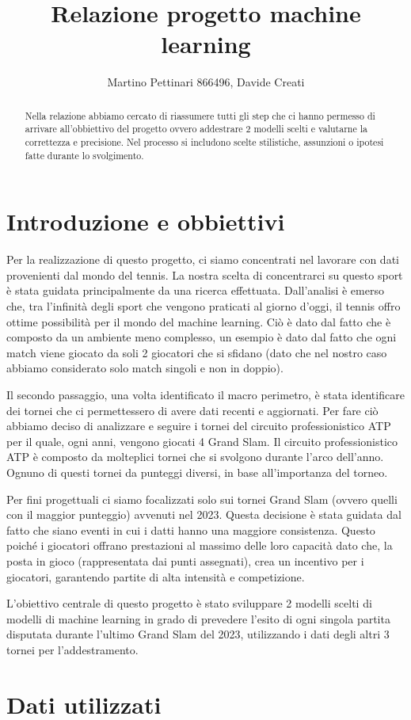 \documentclass[letterpaper,12pt]{article}
\begin{document}
\title{Relazione progetto machine learning}
\author{Martino Pettinari 866496, Davide Creati}
\maketitle

\begin{abstract}
Nella relazione abbiamo cercato di riassumere tutti gli step che ci hanno permesso di arrivare all'obbiettivo del progetto ovvero addestrare 2 modelli scelti e valutarne la correttezza e precisione. Nel processo si includono scelte stilistiche, assunzioni o ipotesi fatte durante lo svolgimento.
\end{abstract}


\section{Introduzione e obbiettivi}

Per la realizzazione di questo progetto, ci siamo concentrati nel lavorare con dati provenienti dal mondo del tennis. La nostra scelta di concentrarci su questo sport è stata guidata principalmente da una ricerca effettuata. Dall'analisi è emerso che, tra l'infinità degli sport che vengono praticati al giorno d'oggi, il tennis offro ottime possibilità per il mondo del machine learning. Ciò è dato dal fatto che è composto da un ambiente meno complesso, un esempio è dato dal fatto che ogni match viene giocato da soli 2 giocatori che si sfidano (dato che nel nostro caso abbiamo considerato solo match singoli e non in doppio). 

Il secondo passaggio, una volta identificato il macro perimetro, è stata identificare dei tornei che ci permettessero di avere dati recenti e aggiornati. Per fare ciò abbiamo deciso di analizzare e seguire i tornei del circuito professionistico ATP per il quale, ogni anni, vengono giocati 4 Grand Slam. Il circuito professionistico ATP è composto da molteplici tornei che si svolgono durante l'arco dell'anno. Ognuno di questi tornei da punteggi diversi, in base all'importanza del torneo. 

Per fini progettuali ci siamo focalizzati solo sui tornei Grand Slam (ovvero quelli con il maggior punteggio) avvenuti nel 2023. Questa decisione è stata guidata dal fatto che siano eventi in cui i datti hanno una maggiore consistenza. Questo poiché i giocatori offrano prestazioni al massimo delle loro capacità dato che, la posta in gioco (rappresentata dai punti assegnati), crea un incentivo per i giocatori, garantendo partite di alta intensità e competizione. 

L'obiettivo centrale di questo progetto è stato sviluppare 2 modelli scelti di modelli di machine learning in grado di prevedere l'esito di ogni singola partita disputata durante l'ultimo Grand Slam del 2023, utilizzando i dati degli altri 3 tornei per l'addestramento. 

\section{Dati utilizzati}
\end{document}
